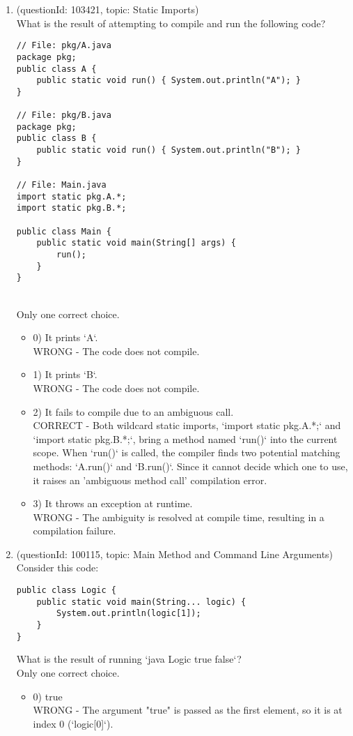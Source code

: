 \documentclass[12pt]{article}
\begin{document}
\begin{enumerate}[label=(\arabic*)]
\begin{itemize}
\end{itemize}
\item (questionId: 103421, topic: Static Imports) \\ 
What is the result of attempting to compile and run the following code?
\begin{verbatim}
// File: pkg/A.java
package pkg;
public class A { 
    public static void run() { System.out.println("A"); } 
}

// File: pkg/B.java
package pkg;
public class B { 
    public static void run() { System.out.println("B"); } 
}

// File: Main.java
import static pkg.A.*;
import static pkg.B.*;

public class Main {
    public static void main(String[] args) {
        run();
    }
}
\end{verbatim}
\\ \noindent Only one correct choice. 
\begin{itemize}
\item 0) It prints `A`.
 \\ 
WRONG - The code does not compile.

\item 1) It prints `B`.
 \\ 
WRONG - The code does not compile.

\item 2) It fails to compile due to an ambiguous call.
 \\ 
CORRECT - Both wildcard static imports, `import static pkg.A.*;` and `import static pkg.B.*;`, bring a method named `run()` into the current scope. When `run()` is called, the compiler finds two potential matching methods: `A.run()` and `B.run()`. Since it cannot decide which one to use, it raises an 'ambiguous method call' compilation error.

\item 3) It throws an exception at runtime.
 \\ 
WRONG - The ambiguity is resolved at compile time, resulting in a compilation failure.

\end{itemize}
\item (questionId: 100115, topic: Main Method and Command Line Arguments) \\ 
Consider this code:
\begin{verbatim}
public class Logic {
    public static void main(String... logic) {
        System.out.println(logic[1]);
    }
}
\end{verbatim}
What is the result of running `java Logic true false`?
\\ \noindent Only one correct choice. 
\begin{itemize}
\item 0) true
 \\ 
WRONG - The argument "true" is passed as the first element, so it is at index 0 (`logic[0]`).


\end{itemize}
\end{enumerate}
\end{document}

